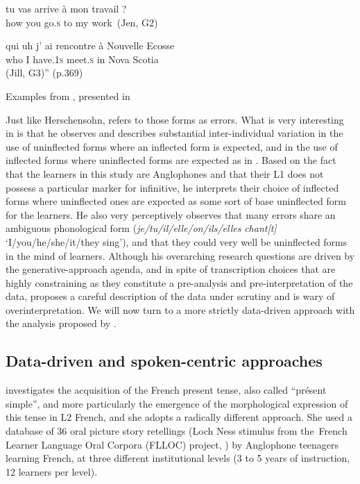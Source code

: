 \documentclass[output=paper,colorlinks,citecolor=brown,modfonts,nonflat]{../langscibook}
\begin{document}
 {tu} {vas} {arrive} {à} {mon} {travail} ?\\
    how         you go.\textsc{s} to my work\
    (Jen, G2)

\ex
{} {qui} {uh} j’ ai {rencontre} {à} {Nouvelle} {Ecosse}\\
      {}  who   {} I have.\textsc{1s} meet.\textsc{s} in Nova Scotia\\
        (Jill, G3)” (p.369)
\z
\z

Examples from \citet{Prévost2007English}, presented in \citet[61]{Prévost2007French}

Just like Herschensohn, \citet{Prévost2007English} refers to those forms as errors. What is very interesting in \citet{Prévost2007English} is that he observes and describes substantial inter-individual variation in the use of uninflected forms where an inflected form is expected, and in the use of inflected forms where uninflected forms are expected as in . Based on the fact that the learners in this study are Anglophones and that their L1 does not possess a particular marker for infinitive, he interprets their choice of inflected forms where uninflected ones are expected as some sort of base uninflected form for the learners. He also very perceptively observes that many errors share an ambiguous phonological form (\textit{je/tu/il/elle/on/ils/elles} \textit{chant[t]} ‘I/you/he/she/it/they sing’), and that they could very well be uninflected forms in the mind of learners. Although his overarching research questions are driven by the generative-approach agenda, and in spite of transcription choices that are highly constraining as they constitute a pre-analysis and pre-interpretation of the data, \citet{Prévost2007English} proposes a careful description of the data under scrutiny and is wary of overinterpretation. We will now turn to a more strictly data-driven approach with the analysis proposed by \citet{Granget2015}.

\subsection{ \textbf{Data-driven and spoken-centric approaches}}%

 \citet{Granget2015} investigates the acquisition of the French present tense, also called “présent simple”, and more particularly the emergence of the morphological expression of this tense in L2 French, and she adopts a radically different approach. She used a database of 36 oral picture story retellings (Loch Ness stimulus from the~French Learner Language Oral Corpora (FLLOC) project, \citealt{MarsdenEtAl2002}) by Anglophone teenagers learning French, at three different institutional levels (3 to 5 years of instruction, 12 learners per level). 
\end{document}
